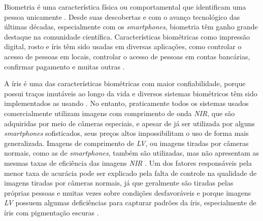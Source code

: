 
\par Biometria é uma característica física ou comportamental que identificam uma pessoa unicamente \cite{wayman2005biometric}. Desde suas descobertas e com o avanço tecnológico das últimas décadas, especialmente com os \textit{smartphones}, biometria têm ganho grande destaque na comunidade científica. Características biométricas como impressão digital, rosto e íris têm sido usadas em diversas aplicações, como controlar o acesso de pessoas em locais, controlar o acesso de pessoas em contas bancárias, confirmar pagamento e muitas outras \cite{li2009encyclopedia, wayman2005biometric}.

\par A íris é uma das características biométricas com maior confiabilidade, porque possui traços imutáveis ao longo da vida e diversos sistemas biométricos têm sido implementados as usando \cite{daugman2004, wayman2005biometric, iris_segmentada,othman2015}. No entanto, praticamente todos os sistemas usados comercialmente utilizam imagens com comprimento de onda \textit{\acrfull{NIR}}, que são adquiridas por meio de câmeras
especiais, e apesar de já ser utilizada por alguns \textit{smartphones} sofisticados, seus preços altos impossibilitam o uso de forma mais generalizada. Imagens de comprimento de \textit{\acrfull{LV}}, ou imagens tiradas por câmeras normais, como as
de \textit{smartphones}, também são utilizadas, mas não apresentam as mesmas taxas de eficiência das
imagens \textit{\acrshort{NIR}} \cite{proenca2011,raja2014, raja2015, trokielwicz2016-Warsaw}. Um dos fatores responsáveis pela menor taxa de acurácia pode ser explicado pela falta de controle na qualidade de imagens tiradas por câmeras normais, já que geralmente são tiradas pelas próprias pessoas e muitas vezes sobre condições desfavoráveis e porque imagens \textit{\acrshort{LV}} possuem algumas deficiências para capturar padrões da íris, especialmente de íris com pigmentação escuras \cite{abdullah2015}. 

